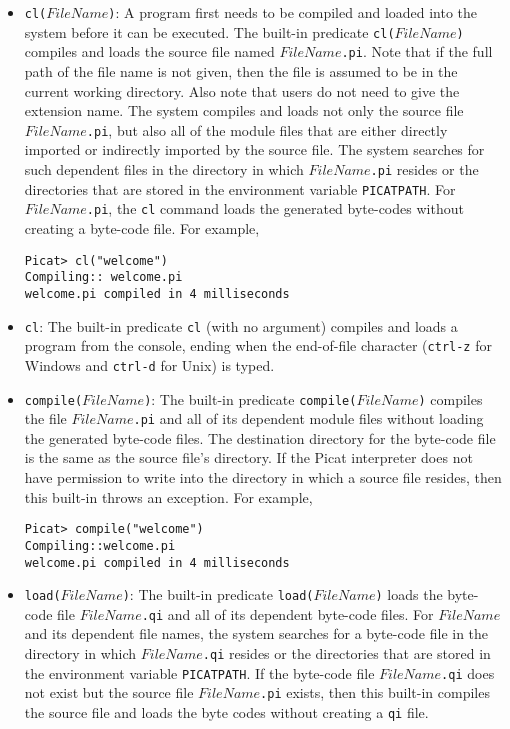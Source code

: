 \begin{itemize}
\item \texttt{cl($FileName$)}: A program first needs to be compiled and loaded into the system before it can be executed. The built-in predicate \texttt{cl($FileName$)} compiles and loads the source file named \texttt{$FileName$.pi}. Note that if the full path of the file name is not given, then the file is assumed to be in the current working directory. Also note that users do not need to give the extension name. The system compiles and loads not only the source file \texttt{$FileName$.pi}, but also all of the module files that are either directly imported or indirectly imported by the source file. The system searches for such dependent files in the directory in which \texttt{$FileName$.pi} resides or the directories that are stored in the environment variable \texttt{PICATPATH}. For \texttt{$FileName$.pi}, the \texttt{cl} command loads the generated byte-codes without creating a byte-code file. For example,
\begin{verbatim}
Picat> cl("welcome")
Compiling:: welcome.pi
welcome.pi compiled in 4 milliseconds
\end{verbatim}

\item \texttt{cl}: The built-in predicate \texttt{cl} (with no argument) compiles and loads a program from the console, ending when the end-of-file character ({\tt ctrl-z} for Windows and {\tt ctrl-d} for Unix) is typed.

\item \texttt{compile($FileName$)}: The built-in predicate \texttt{compile($FileName$)} compiles the file \texttt{$FileName$.pi} and all of its dependent module files without loading the generated byte-code files. The destination directory for the byte-code file is the same as the source file's directory. If the Picat interpreter does not have permission to write into the directory in which a source file resides, then this built-in throws an exception. For example,

\begin{verbatim}
Picat> compile("welcome")
Compiling::welcome.pi
welcome.pi compiled in 4 milliseconds
\end{verbatim}

\item \texttt{load($FileName$)}: The built-in predicate \texttt{load($FileName$)} loads the byte-code file \texttt{$FileName$.qi} and all of its dependent byte-code files. For $FileName$ and its dependent file names,  the system searches for a byte-code file in the directory in which \texttt{$FileName$.qi} resides or the directories that are stored in the environment variable \texttt{PICATPATH}. If the byte-code file \texttt{$FileName$.qi} does not exist but the source file \texttt{$FileName$.pi} exists, then this built-in compiles the source file and loads the byte codes without creating a {\tt qi} file.


\end{itemize}
